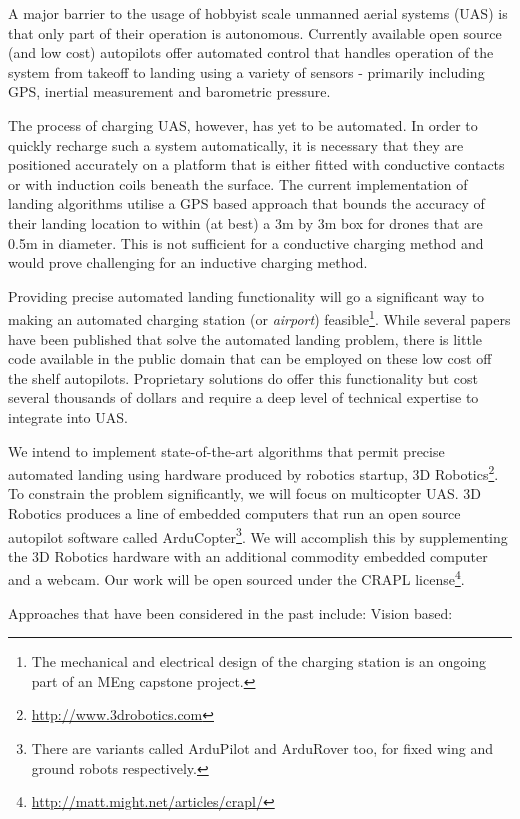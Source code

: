 A major barrier to the usage of hobbyist scale unmanned aerial systems (UAS) is that only part of their operation is autonomous. Currently available open source (and low cost) autopilots offer  automated control that handles operation of the system from takeoff to landing using a variety of sensors - primarily including GPS, inertial measurement and barometric pressure. 

The process of charging UAS, however, has yet to be automated. In order to quickly recharge such a system automatically, it is necessary that they are positioned accurately on a platform that is either fitted with conductive contacts or with induction coils beneath the surface. The current implementation of landing algorithms utilise a GPS based approach that bounds the accuracy of their landing location to within (at best) a 3m by 3m box for drones that are 0.5m in diameter.  This is not sufficient for a conductive charging method and would prove challenging for an inductive charging method.

Providing precise automated landing functionality will go a significant way to making an automated charging station (or \textit{airport}) feasible\footnote{The mechanical and electrical design of the charging station is an ongoing part of an MEng capstone project.}. While several papers have been published that solve the automated landing problem, there is little code available in the public domain that can be employed on these low cost off the shelf autopilots. Proprietary solutions do offer this functionality but cost several thousands of dollars and require a deep level of technical expertise to integrate into UAS.

We intend to implement state-of-the-art algorithms that permit precise automated landing using hardware produced by robotics startup, 3D Robotics\footnote{\url{http://www.3drobotics.com}}. To constrain the problem significantly, we will focus on multicopter UAS. 3D Robotics produces a line of embedded computers that run an open source autopilot software called ArduCopter\footnote{There are variants called ArduPilot and ArduRover too, for fixed wing and ground robots respectively.}. We will accomplish this by supplementing the 3D Robotics hardware with an additional commodity embedded computer and a webcam. Our work will be open sourced under the CRAPL license\footnote{\url{http://matt.might.net/articles/crapl/}}.

Approaches that have been considered in the past include:
Vision based: 
\cite{simamitra2013} 
\cite{ginkel2013} 
\cite{green2003autonomous}
\cite{merz2006autonomous}
\cite{garcia2002towards}
\cite{johnson2005vision}
\cite{saripalli2002vision}